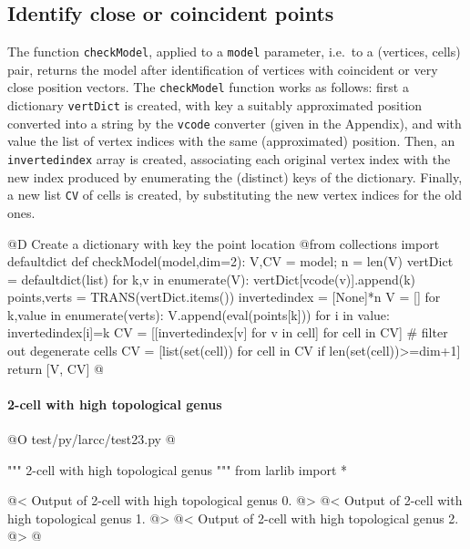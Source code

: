 \documentclass[11pt,oneside]{article}    %
\begin{document}
\subsection{Identify close or coincident points}

The function \texttt{checkModel}, applied to a \texttt{model} parameter, i.e.~to a (vertices, cells)  pair, returns the model after identification of vertices with coincident or very close position vectors.
The \texttt{checkModel} function works as follows: first a dictionary \texttt{vertDict} is created, with key a suitably approximated position converted into a string by the \texttt{vcode} converter (given in the Appendix), and with value the list of vertex indices with the same (approximated) position. Then, an \texttt{invertedindex} array is created, associating each original vertex index with the new index produced by enumerating the (distinct) keys of the dictionary. Finally, a new list \texttt{CV} of cells is created, by substituting the new vertex indices for the old ones. 

@D Create a dictionary with key the point location
@{from collections import defaultdict
def checkModel(model,dim=2):
    V,CV = model; n = len(V)
    vertDict = defaultdict(list)
    for k,v in enumerate(V): vertDict[vcode(v)].append(k) 
    points,verts = TRANS(vertDict.items())
    invertedindex = [None]*n
    V = []
    for k,value in enumerate(verts):
        V.append(eval(points[k]))
        for i in value:
            invertedindex[i]=k    
    CV = [[invertedindex[v] for v in cell] for cell in CV]
    # filter out degenerate cells
    CV = [list(set(cell)) for cell in CV if len(set(cell))>=dim+1]
    return [V, CV]
@}


\paragraph{2-cell with high topological genus}

@O test/py/larcc/test23.py
@{""" 2-cell with high topological genus """
from larlib import *

@< Output of 2-cell with high topological genus 0. @>
@< Output of 2-cell with high topological genus 1. @>
@< Output of 2-cell with high topological genus 2. @>
@}
\end{document}
